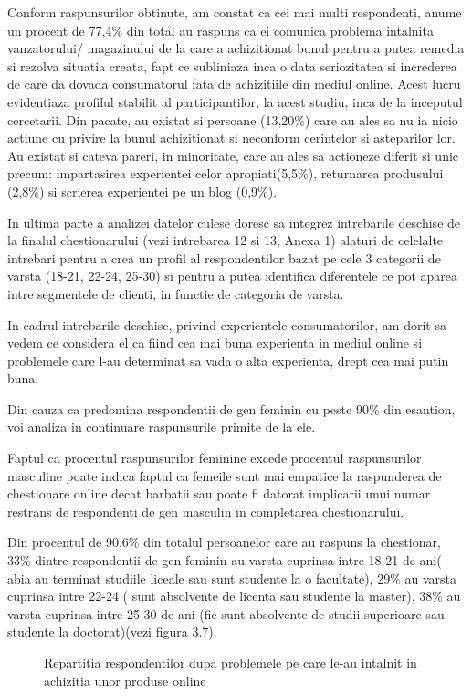 \documentclass[a4paper, 12pt]{article}
\begin{document}
	\quad Conform raspunsurilor obtinute, am constat ca cei mai multi respondenti, anume un procent de 77,4\% din total au raspuns ca ei comunica problema intalnita vanzatorului/ magazinului de la care a achizitionat bunul pentru a putea remedia si rezolva situatia creata, fapt ce subliniaza inca o data seriozitatea si increderea de care da dovada consumatorul fata de achizitiile din mediul online. Acest lucru evidentiaza profilul stabilit al participantilor, la acest studiu, inca de la inceputul cercetarii. Din pacate, au existat si persoane (13,20\%) care au ales sa nu ia nicio actiune cu privire la bunul achizitionat si neconform cerintelor si asteparilor lor. Au existat si cateva pareri, in minoritate, care au ales sa actioneze diferit si unic precum: impartasirea experientei celor apropiati(5,5\%), returnarea produsului (2,8\%) si scrierea experientei pe un blog (0,9\%).
	
	\quad In ultima parte a analizei datelor culese doresc sa integrez intrebarile deschise de la finalul chestionarului (vezi intrebarea 12 si 13, Anexa 1) alaturi de celelalte intrebari pentru a crea un profil al respondentilor bazat pe cele 3 categorii de varsta (18-21, 22-24, 25-30) si pentru a putea identifica diferentele ce pot aparea intre segmentele de clienti, in functie de categoria de varsta. 
	
	\quad In cadrul intrebarile deschise, privind experientele consumatorilor, am dorit sa vedem ce considera  el ca fiind cea mai buna experienta in mediul online si problemele care l-au determinat sa vada o alta experienta, drept cea mai putin buna.
	
	\quad Din cauza ca predomina  respondentii de gen feminin  cu peste 90\% din esantion, voi analiza in continuare raspunsurile primite de la ele.
	
	\quad Faptul ca procentul raspunsurilor feminine excede procentul raspunsurilor masculine poate indica faptul ca femeile sunt mai empatice la raspunderea de chestionare online decat barbatii sau poate fi datorat implicarii unui numar restrans de respondenti de gen masculin in completarea chestionarului.

	\quad Din procentul de 90,6\% din totalul persoanelor care au raspuns la chestionar, 33\% dintre respondentii de gen feminin au varsta cuprinsa intre 18-21 de ani( abia au terminat studiile liceale sau sunt studente la o facultate), 29\% au varsta cuprinsa intre 22-24 ( sunt absolvente de licenta sau studente la master), 38\% au varsta cuprinsa intre 25-30 de ani (fie sunt absolvente de studii superioare sau studente la doctorat)(vezi figura 3.7).
	\begin{figure}[!htb]
		\centering
		\caption{Repartitia respondentilor dupa problemele pe care le-au intalnit in achizitia unor produse online} 
	\end{figure}
	
\end{document}
